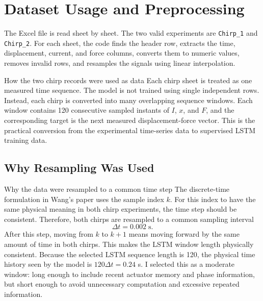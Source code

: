 \documentclass[11pt]{article}
\begin{document}
\section{Dataset Usage and Preprocessing}
The Excel file is read sheet by sheet. The two valid experiments are \texttt{Chirp\_1} and \texttt{Chirp\_2}. For each sheet, the code finds the header row, extracts the time, displacement, current, and force columns, converts them to numeric values, removes invalid rows, and resamples the signals using linear interpolation.

\begin{datadecisionbox}{How the two chirp records were used as data}
Each chirp sheet is treated as one measured time sequence. The model is not trained using single independent rows. Instead, each chirp is converted into many overlapping sequence windows. Each window contains 120 consecutive sampled instants of $I$, $x$, and $F$, and the corresponding target is the next measured displacement-force vector. This is the practical conversion from the experimental time-series data to supervised LSTM training data.
\end{datadecisionbox}

\subsection{Why Resampling Was Used}
\begin{datadecisionbox}{Why the data were resampled to a common time step}
The discrete-time formulation in Wang's paper uses the sample index $k$. For this index to have the same physical meaning in both chirp experiments, the time step should be consistent. Therefore, both chirps are resampled to a common sampling interval
\begin{equation}
\Delta t = 0.002 \; \text{s}.
\end{equation}
After this step, moving from $k$ to $k+1$ means moving forward by the same amount of time in both chirps. This makes the LSTM window length physically consistent. Because the selected LSTM sequence length is 120, the physical time history seen by the model is $120\Delta t=0.24$ s. I selected this as a moderate window: long enough to include recent actuator memory and phase information, but short enough to avoid unnecessary computation and excessive repeated information.
\end{datadecisionbox}
\end{document}
